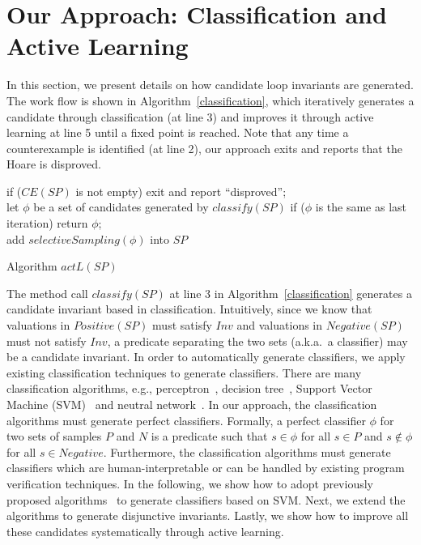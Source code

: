 \section{Our Approach: Classification and Active Learning}
\label{sec:classifierlearning}
In this section, we present details on how candidate loop invariants are generated. The work flow is shown in Algorithm~\ref{classification}, which iteratively generates a candidate through classification (at line 3) and improves it through active learning at line 5 until a fixed point is reached. Note that any time a counterexample is identified (at line 2), our approach exits and reports that the Hoare is disproved.

\begin{algorithm}[t]
\SetAlgoVlined
\Indm
\Indp
{} {
    if ($CE(SP)$ is not empty) { exit and report ``disproved''; } \\
    let $\phi$ be a set of candidates generated by $classify(SP)$\;
    if ($\phi$ is the same as last iteration){ return $\phi$; } \\
    add $selectiveSampling(\phi)$ into $SP$\;
}
\caption{Algorithm $actL(SP)$}
\label{classification}
\end{algorithm}

The method call $classify(SP)$ at line 3 in Algorithm~\ref{classification} generates a candidate invariant based in classification. Intuitively, since we know that valuations in $Positive(SP)$ must satisfy $Inv$ and valuations in $Negative(SP)$ must not satisfy $Inv$, a predicate separating the two sets (a.k.a.~a classifier) may be a candidate invariant. In order to automatically generate classifiers, we apply existing classification techniques to generate classifiers. There are many classification algorithms, e.g., perceptron~\cite{perceptron}, decision tree~\cite{quinlan1986induction}, Support Vector Machine (SVM)~\cite{svm:original} and neutral network~\cite{nn}.
In our approach, the classification algorithms must generate perfect classifiers. Formally, a perfect classifier $\phi$ for two sets of samples $P$ and $N$ is a predicate such that $s \in \phi$ for all $s \in P$ and $s \not \in \phi$ for all $s \in Negative$. Furthermore, the classification algorithms must generate classifiers which are human-interpretable or can be handled by existing program verification techniques.  
In the following, we show how to adopt previously proposed algorithms~\cite{sharma2012interpolants} to generate classifiers based on SVM. Next, we extend the algorithms to generate disjunctive invariants. Lastly, we show how to improve all these candidates systematically through active learning.

